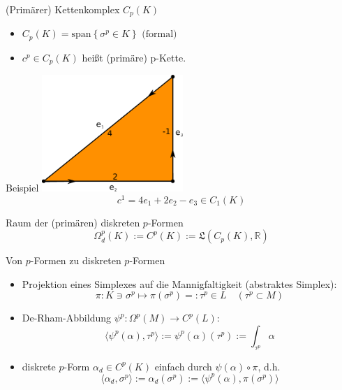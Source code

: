 \documentclass{beamer}
\newcommand{\R}{\mathds{R}}
\begin{document}
  \begin{frame}
    \begin{block}{(Primärer) Kettenkomplex \( C_{p}(K) \)}
      \begin{itemize}
        \item \( C_{p}(K) = \text{span}\left\{ \sigma^{p} \in K \right\} \text{ (formal)}\)
        \item \( c^{p} \in C_{p}(K) \) heißt (primäre) p-Kette.
      \end{itemize}
    \end{block}
    \begin{block}{Beispiel}
      \centering\includegraphics[width=0.4\textwidth]{bilder/inkscape/bspKette.eps}
      \[ c^{1} =  4e_{1} + 2e_{2} - e_{3} \in C_{1}(K) \]
    \end{block}
  \end{frame}

  \begin{frame}
    \begin{block}{Raum der (primären) diskreten \( p \)-Formen }
      \[ \Omega^{p}_{d}(K) := C^{p}(K) := \mathfrak{L}(C_{p}(K), \R) \]
    \end{block}
    \begin{block}{Von \( p \)-Formen zu diskreten \( p \)-Formen}
      \begin{itemize}
        \item Projektion eines Simplexes auf die Mannigfaltigkeit (abstraktes Simplex):
          \[ \pi: K \ni \sigma^{p} \longmapsto \pi(\sigma^{p}) =: \tau^{p} \in L \quad (\tau^{p} \subset M)  \]
        \item De-Rham-Abbildung \( \psi^{p}: \Omega^{p}(M) \rightarrow C^{p}(L)\):
          \[ \langle\psi^{p}(\alpha) , \tau^{p} \rangle := \psi^{p}(\alpha)(\tau^{p}) :=\int_{\tau^{p}} \alpha  \]
        \item diskrete \( p \)-Form \( \alpha_{d} \in C^{p}(K)\) einfach durch \( \psi(\alpha)\circ\pi \), d.h. 
          \[ \langle \alpha_{d} , \sigma^{p} \rangle := \alpha_{d}(\sigma^{p}) := \langle \psi^{p}(\alpha) , \pi(\sigma^{p}) \rangle\]
      \end{itemize}
    \end{block}
  \end{frame}
 
\end{document}
